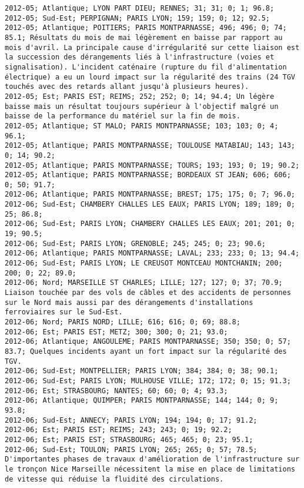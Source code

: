 \documentclass{article}
\begin{document}
\begin{Verbatim}[commandchars=\\\{\}]
2012-05; Atlantique; LYON PART DIEU; RENNES; 31; 31; 0; 1; 96.8; 
2012-05; Sud-Est; PERPIGNAN; PARIS LYON; 159; 159; 0; 12; 92.5; 
2012-05; Atlantique; POITIERS; PARIS MONTPARNASSE; 496; 496; 0; 74; 85.1; Résultats du mois de mai légèrement en baisse par rapport au mois d'avril. La principale cause d'irrégularité sur cette liaison est la succession des dérangements liés à l'infrastructure (voies et signalisation). L'incident caténaire (rupture du fil d'alimentation électrique) a eu un lourd impact sur la régularité des trains (24 TGV touchés avec des retards allant jusqu'à plusieurs heures).
2012-05; Est; PARIS EST; REIMS; 252; 252; 0; 14; 94.4; Un légère baisse mais un résultat toujours supérieur à l'objectif malgré un baisse de la performance du matériel sur la fin de mois.
2012-05; Atlantique; ST MALO; PARIS MONTPARNASSE; 103; 103; 0; 4; 96.1; 
2012-05; Atlantique; PARIS MONTPARNASSE; TOULOUSE MATABIAU; 143; 143; 0; 14; 90.2; 
2012-05; Atlantique; PARIS MONTPARNASSE; TOURS; 193; 193; 0; 19; 90.2; 
2012-05; Atlantique; PARIS MONTPARNASSE; BORDEAUX ST JEAN; 606; 606; 0; 50; 91.7; 
2012-06; Atlantique; PARIS MONTPARNASSE; BREST; 175; 175; 0; 7; 96.0; 
2012-06; Sud-Est; CHAMBERY CHALLES LES EAUX; PARIS LYON; 189; 189; 0; 25; 86.8; 
2012-06; Sud-Est; PARIS LYON; CHAMBERY CHALLES LES EAUX; 201; 201; 0; 19; 90.5; 
2012-06; Sud-Est; PARIS LYON; GRENOBLE; 245; 245; 0; 23; 90.6; 
2012-06; Atlantique; PARIS MONTPARNASSE; LAVAL; 233; 233; 0; 13; 94.4; 
2012-06; Sud-Est; PARIS LYON; LE CREUSOT MONTCEAU MONTCHANIN; 200; 200; 0; 22; 89.0; 
2012-06; Nord; MARSEILLE ST CHARLES; LILLE; 127; 127; 0; 37; 70.9; Liaison touchée par des vols de câbles et des accidents de personnes sur le Nord mais aussi par des dérangements d'installations ferroviaires sur le Sud-Est.
2012-06; Nord; PARIS NORD; LILLE; 616; 616; 0; 69; 88.8; 
2012-06; Est; PARIS EST; METZ; 300; 300; 0; 21; 93.0; 
2012-06; Atlantique; ANGOULEME; PARIS MONTPARNASSE; 350; 350; 0; 57; 83.7; Quelques incidents ayant un fort impact sur la régularité des TGV.
2012-06; Sud-Est; MONTPELLIER; PARIS LYON; 384; 384; 0; 38; 90.1; 
2012-06; Sud-Est; PARIS LYON; MULHOUSE VILLE; 172; 172; 0; 15; 91.3; 
2012-06; Est; STRASBOURG; NANTES; 60; 60; 0; 4; 93.3; 
2012-06; Atlantique; QUIMPER; PARIS MONTPARNASSE; 144; 144; 0; 9; 93.8; 
2012-06; Sud-Est; ANNECY; PARIS LYON; 194; 194; 0; 17; 91.2; 
2012-06; Est; PARIS EST; REIMS; 243; 243; 0; 19; 92.2; 
2012-06; Est; PARIS EST; STRASBOURG; 465; 465; 0; 23; 95.1; 
2012-06; Sud-Est; TOULON; PARIS LYON; 265; 265; 0; 57; 78.5; D'importantes phases de travaux d'amélioration de l'infrastructure sur le tronçon Nice Marseille nécessitent la mise en place de limitations de vitesse qui réduise la fluidité des circulations.

\end{Verbatim}
\end{document}
